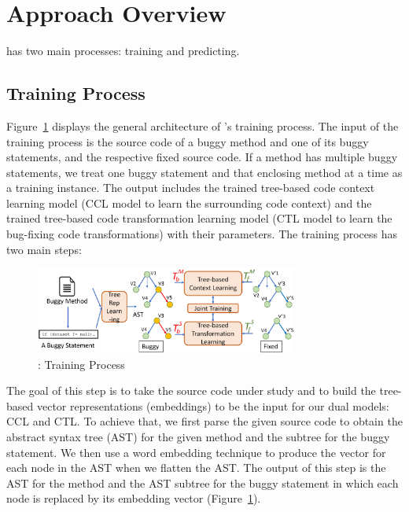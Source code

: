 \section{Approach Overview}
\label{overview:sec}

{\tool} has two main processes: training and predicting.

\subsection{Training Process}

Figure~\ref{overview-training} displays the general architecture of
{\tool}'s training process. The input of the training process is the
source code of a buggy method and one of its buggy statements, and the
respective fixed source code. If a method has multiple buggy
statements, we treat one buggy statement and that enclosing method at
a time as a training instance. The output includes the trained
tree-based code context learning model (CCL model to learn the
surrounding code context) and the trained tree-based code
transformation learning model (CTL model to learn the
bug-fixing code transformations) with their parameters. The training
process has two main steps:

\begin{figure}[t]
	\centering
	\includegraphics[width=3.4in]{graphs/overview-training.png}
        \vspace{-15pt}
	\caption{{\tool}: Training Process}
	\label{overview-training}
\end{figure}

\vspace{3pt}
 The goal of this
step is to take the source code under study and to build the
tree-based vector representations (embeddings) to be the input for our
dual models: CCL and CTL. To achieve that, we first
parse the given source code to obtain the abstract syntax tree (AST)
for the given method and the subtree for the buggy statement.  We
then use a word embedding technique to produce the vector for each
node in the AST when we flatten the AST. The output of this step is
the AST for the method and the AST subtree for the buggy statement in
which each node is replaced by its embedding vector
(Figure~\ref{overview-training}).

